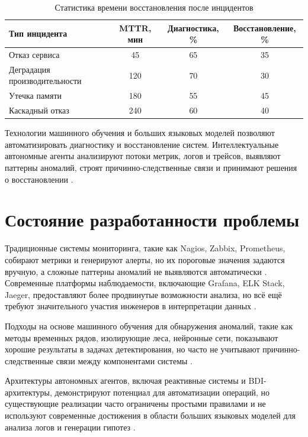 \begin{table}[H]
\centering
\small
\caption{Статистика времени восстановления после инцидентов}
\label{tab:recovery_time_stats}
\begin{tabular}{|p{5cm}|c|c|c|}
\hline
\textbf{Тип инцидента} & \textbf{MTTR, мин} & \textbf{Диагностика, \%} & \textbf{Восстановление, \%} \\
\hline
Отказ сервиса & 45 & 65 & 35 \\
\hline
Деградация производительности & 120 & 70 & 30 \\
\hline
Утечка памяти & 180 & 55 & 45 \\
\hline
Каскадный отказ & 240 & 60 & 40 \\
\hline
\end{tabular}
\end{table}

Технологии машинного обучения и больших языковых моделей позволяют автоматизировать диагностику и восстановление систем. Интеллектуальные автономные агенты анализируют потоки метрик, логов и трейсов, выявляют паттерны аномалий, строят причинно-следственные связи и принимают решения о восстановлении \cite{aiops_survey}.

\section*{Состояние разработанности проблемы}

Традиционные системы мониторинга, такие как Nagios, Zabbix, Prometheus, собирают метрики и генерируют алерты, но их пороговые значения задаются вручную, а сложные паттерны аномалий не выявляются автоматически \cite{prometheus_docs}. Современные платформы наблюдаемости, включающие Grafana, ELK Stack, Jaeger, предоставляют более продвинутые возможности анализа, но всё ещё требуют значительного участия инженеров в интерпретации данных \cite{grafana_docs,charity_majors_observability}.

Подходы на основе машинного обучения для обнаружения аномалий, такие как методы временных рядов, изолирующие леса, нейронные сети, показывают хорошие результаты в задачах детектирования, но часто не учитывают причинно-следственные связи между компонентами системы \cite{hastie_elements,bishop_pattern_recognition}.

Архитектуры автономных агентов, включая реактивные системы и BDI-архитектуры, демонстрируют потенциал для автоматизации операций, но существующие реализации часто ограничены простыми правилами и не используют современные достижения в области больших языковых моделей для анализа логов и генерации гипотез \cite{aiops_survey}.

